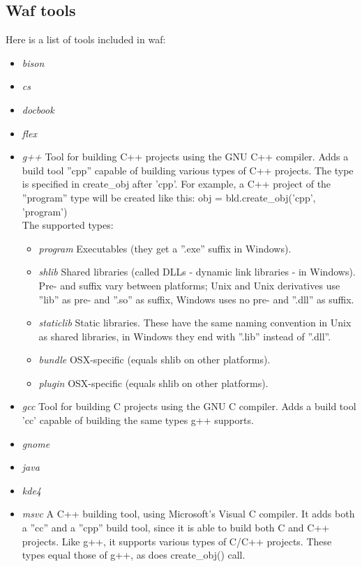 \documentclass[a4,10pt]{article}
\begin{document}
\subsection{Waf tools}
Here is a list of tools included in waf:
\begin{itemize}
	\item \emph{bison}
	\item \emph{cs}
	\item \emph{docbook}
	\item \emph{flex}
	\item \emph{g++}
		Tool for building C++ projects using the GNU C++ compiler. Adds a build tool ''cpp'' capable of building various types of C++ projects. The type is specified in create\_obj after 'cpp'. For example, a C++ project of the ''program'' type will be created like this: obj = bld.create\_obj('cpp', 'program')\\
		The supported types:
		\begin{itemize}
			\item \emph{program} Executables (they get a ''.exe'' suffix in Windows).
			\item \emph{shlib} Shared libraries (called DLLs - dynamic link libraries - in Windows). Pre- and suffix vary between platforms; Unix and Unix derivatives use ''lib'' as pre- and ''.so'' as suffix, Windows uses no pre- and ''.dll'' as suffix.
			\item \emph{staticlib} Static libraries. These have the same naming convention in Unix as shared libraries, in Windows they end with ''.lib'' instead of ''.dll''.
			\item \emph{bundle} OSX-specific (equals shlib on other platforms).
			\item \emph{plugin} OSX-specific (equals shlib on other platforms).
		\end{itemize}
	\item \emph{gcc}
		Tool for building C projects using the GNU C compiler. Adds a build tool 'cc' capable of building the same types g++ supports.
	\item \emph{gnome}
	\item \emph{java}
	\item \emph{kde4}
	\item \emph{msvc}
		A C++ building tool, using Microsoft's Visual C compiler. It adds both a ''cc'' and a ''cpp'' build tool, since it is able to build both C and C++ projects. Like g++, it supports various types of C/C++ projects. These types equal those of g++, as does create\_obj() call.\\

\end{itemize}
\end{document}
